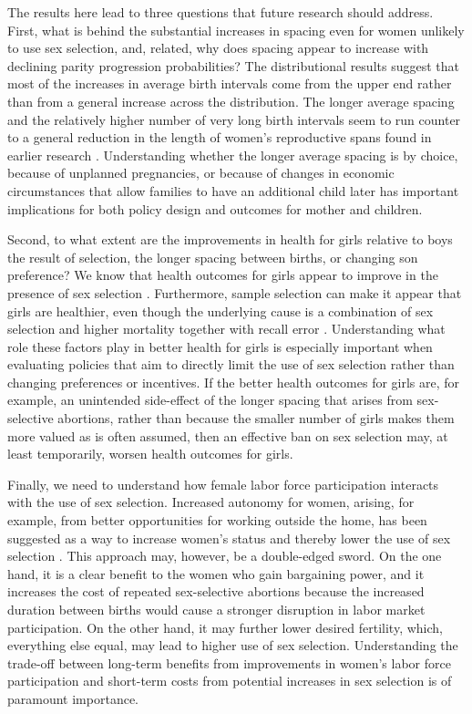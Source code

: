 \documentclass[12pt,letterpaper]{article}
\begin{document}
The results here lead to three questions that future research should address.
First, what is behind the substantial increases in spacing even for women unlikely to use 
sex selection, and, related, why does spacing appear to increase with declining 
parity progression probabilities?
The distributional results suggest that most of the increases in average birth intervals 
come from the upper end rather than from a general increase across the distribution.
The longer average spacing and the relatively higher number of very long birth intervals 
seem to run counter to a general reduction in the length of women's reproductive spans 
found in earlier research \citep{Padmadas2004}.
Understanding whether the longer average spacing is by choice, because of unplanned 
pregnancies, or because of changes in economic circumstances that allow families to have 
an additional child later has important implications for both policy design and outcomes 
for mother and children.

Second, to what extent are the improvements in health for girls relative to boys the result 
of selection, the longer spacing between births, or changing son preference?
We know that health outcomes for girls appear to improve in the presence of sex selection 
\citep{Lin2014,Hu2015}.
Furthermore, sample selection can make it appear that girls are healthier, even though the 
underlying cause is a combination of sex selection and higher mortality together with 
recall error \citep{Portner2018a}. 
Understanding what role these factors play in better health for girls is especially 
important when evaluating policies that aim to directly limit the use of sex selection 
rather than changing preferences or incentives.
If the better health outcomes for girls are, for example, an unintended side-effect of the 
longer spacing that arises from sex-selective abortions, rather than because the smaller 
number of girls makes them more valued as is often assumed, then an effective ban on sex 
selection may, at least temporarily, worsen health outcomes for girls.

Finally, we need to understand how female labor force participation interacts with the use 
of sex selection.
Increased autonomy for women, arising, for example, from better opportunities for working 
outside the home, has been suggested as a way to increase women's status and thereby lower 
the use of sex selection \citep{Das-Gupta2016}.
This approach may, however, be a double-edged sword.
On the one hand, it is a clear benefit to the women who gain bargaining power, and it 
increases the cost of repeated sex-selective abortions because the increased duration 
between births would cause a stronger disruption in labor market participation.
On the other hand, it may further lower desired fertility, which, everything else equal, 
may lead to higher use of sex selection.
Understanding the trade-off between long-term benefits from improvements in women's labor 
force participation and short-term costs from potential increases in sex selection is of 
paramount importance.
\end{document}
